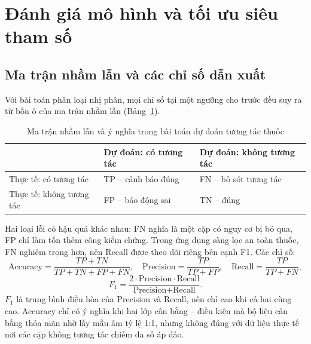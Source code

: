 \documentclass[12pt,a4paper,oneside]{report}
\begin{document}
\section{Đánh giá mô hình và tối ưu siêu tham số}
\label{sec:danhgialythuyet}

\subsection{Ma trận nhầm lẫn và các chỉ số dẫn xuất}
Với bài toán phân loại nhị phân, mọi chỉ số tại một ngưỡng cho trước đều suy ra
từ bốn ô của ma trận nhầm lẫn (Bảng~\ref{tab:nhamlan}).

\begin{table}[H]
  \centering
  \caption{Ma trận nhầm lẫn và ý nghĩa trong bài toán dự đoán tương tác thuốc}
  \label{tab:nhamlan}
  \small
  \begin{tabularx}{\textwidth}{>{\raggedright\arraybackslash}p{2.9cm}
      >{\raggedright\arraybackslash}X >{\raggedright\arraybackslash}X}
    \toprule
    & \textbf{Dự đoán: có tương tác} & \textbf{Dự đoán: không tương tác} \\
    \midrule
    Thực tế: có tương tác & TP -- cảnh báo đúng & FN -- bỏ sót tương tác \\
    Thực tế: không tương tác & FP -- báo động sai & TN -- đúng \\
    \bottomrule
  \end{tabularx}
\end{table}

Hai loại lỗi có hậu quả khác nhau: FN nghĩa là một cặp có nguy cơ bị bỏ qua,
FP chỉ làm tốn thêm công kiểm chứng. Trong ứng dụng sàng lọc an toàn thuốc, FN
nghiêm trọng hơn, nên Recall được theo dõi riêng bên cạnh F1. Các chỉ số:
\begin{equation}
  \text{Accuracy} = \frac{TP + TN}{TP + TN + FP + FN}, \quad
  \text{Precision} = \frac{TP}{TP + FP}, \quad
  \text{Recall} = \frac{TP}{TP + FN},
  \label{eq:acc}
\end{equation}
\begin{equation}
  F_1 = \frac{2 \cdot \text{Precision} \cdot \text{Recall}}
             {\text{Precision} + \text{Recall}} .
  \label{eq:f1}
\end{equation}
$F_1$ là trung bình điều hòa của Precision và Recall, nên chỉ cao khi cả
hai cùng cao. Accuracy chỉ có ý nghĩa khi hai lớp cân bằng -- điều kiện mà bộ
liệu cân bằng thỏa mãn nhờ lấy mẫu âm tỷ lệ 1:1, nhưng không đúng với dữ liệu
thực tế nơi các cặp không tương tác chiếm đa số áp đảo.
\end{document}

